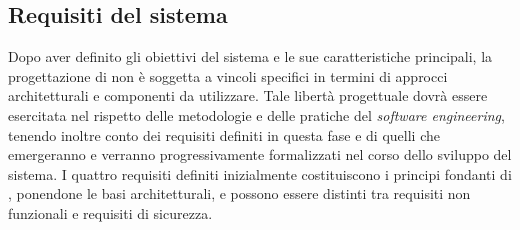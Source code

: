 
\subsection{Requisiti del sistema} %

Dopo aver definito gli obiettivi del sistema e le sue caratteristiche principali, la progettazione di \system{} non è soggetta a vincoli specifici in termini di approcci architetturali e componenti da utilizzare. Tale libertà progettuale dovrà essere esercitata nel rispetto delle metodologie e delle pratiche del \emph{software engineering}, tenendo inoltre conto dei requisiti definiti in questa fase e di quelli che emergeranno e verranno progressivamente formalizzati nel corso dello sviluppo del sistema. I quattro requisiti definiti inizialmente costituiscono i principi fondanti di \system{}, ponendone le basi architetturali, e possono essere distinti tra requisiti non funzionali e requisiti di sicurezza.


